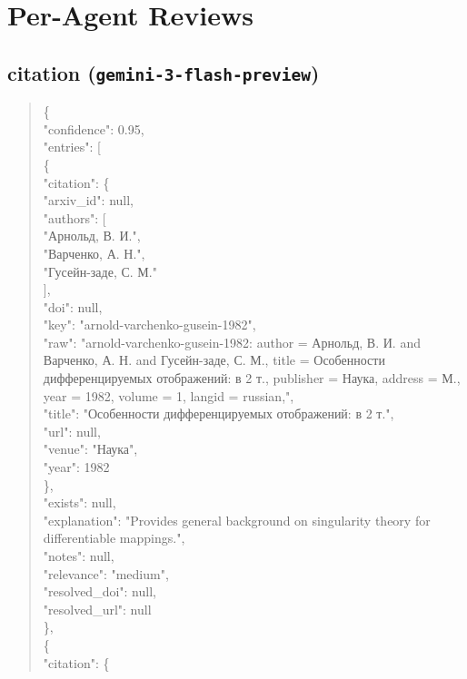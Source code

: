 \documentclass[11pt]{article}
\begin{document}
\section*{Per-Agent Reviews}
\subsection*{citation (\texttt{gemini-3-flash-preview})}
\begin{quote}\small\ttfamily\raggedright
\{\\
  "confidence": 0.95,\\
  "entries": [\\
    \{\\
      "citation": \{\\
        "arxiv\_id": null,\\
        "authors": [\\
          "Арнольд, В. И.",\\
          "Варченко, А. Н.",\\
          "Гусейн-заде, С. М."\\
        ],\\
        "doi": null,\\
        "key": "arnold-varchenko-gusein-1982",\\
        "raw": "arnold-varchenko-gusein-1982: author = Арнольд, В. И. and Варченко, А. Н. and Гусейн-заде, С. М., title = Особенности дифференцируемых отображений: в 2 т., publisher = Наука, address = М., year = 1982, volume = 1, langid = russian,",\\
        "title": "Особенности дифференцируемых отображений: в 2 т.",\\
        "url": null,\\
        "venue": "Наука",\\
        "year": 1982\\
      \},\\
      "exists": null,\\
      "explanation": "Provides general background on singularity theory for differentiable mappings.",\\
      "notes": null,\\
      "relevance": "medium",\\
      "resolved\_doi": null,\\
      "resolved\_url": null\\
    \},\\
    \{\\
      "citation": \{\\

\end{quote}
\end{document}
